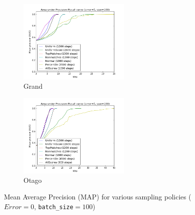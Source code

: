 \begin{figure}[htbp]
  \centering
  \begin{subfigure}[t]{\textwidth}
      \centering
      \includegraphics[width=0.6\textwidth]{policies/grand}
      \caption{Grand}
  \end{subfigure}%

  \begin{subfigure}[t]{\textwidth}
      \centering
      \includegraphics[width=0.6\textwidth]{policies/otago}
      \caption{Otago}
  \end{subfigure}%
  \captionsetup{justification=centering}
  \caption{Mean Average Precision (MAP) for various sampling policies ($Error=0$, \texttt{batch\_size}$=100$)}
\end{figure}


